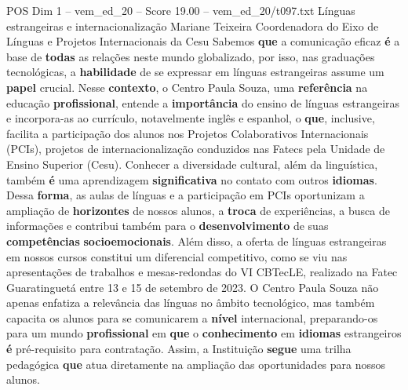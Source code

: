 \begin{textsample}{POS Dim 1 – vem\_ed\_20 – Score 19.00 – vem\_ed\_20/t097.txt}  \label{ex:f1_pos_106}
Línguas estrangeiras e internacionalização Mariane Teixeira Coordenadora do Eixo de Línguas e Projetos Internacionais da Cesu Sabemos \textbf{que} a comunicação eficaz \textbf{é} a base de \textbf{todas} as relações neste mundo globalizado, por isso, nas graduações tecnológicas, a \textbf{habilidade} de se expressar em línguas estrangeiras assume um \textbf{papel} crucial.
Nesse \textbf{contexto}, o Centro Paula Souza, uma \textbf{referência} na educação \textbf{profissional}, entende a \textbf{importância} do ensino de línguas estrangeiras e incorpora-as ao currículo, notavelmente inglês e espanhol, o \textbf{que}, inclusive, facilita a participação dos alunos nos Projetos Colaborativos Internacionais (PCIs), projetos de internacionalização conduzidos nas Fatecs pela Unidade de Ensino Superior (Cesu).
Conhecer a diversidade cultural, além da linguística, também \textbf{é} uma aprendizagem \textbf{significativa} no contato com outros \textbf{idiomas}.
Dessa \textbf{forma}, as aulas de línguas e a participação em PCIs oportunizam a ampliação de \textbf{horizontes} de nossos alunos, a \textbf{troca} de experiências, a busca de informações e contribui também para o \textbf{desenvolvimento} de suas \textbf{competências} \textbf{socioemocionais}.
Além disso, a oferta de línguas estrangeiras em nossos cursos constitui um diferencial competitivo, como se viu nas apresentações de trabalhos e mesas-redondas do VI CBTecLE, realizado na Fatec Guaratinguetá entre 13 e 15 de setembro de 2023.
O Centro Paula Souza não apenas enfatiza a relevância das línguas no âmbito tecnológico, mas também capacita os alunos para se comunicarem a \textbf{nível} internacional, preparando-os para um mundo \textbf{profissional} em \textbf{que} o \textbf{conhecimento} em \textbf{idiomas} estrangeiros \textbf{é} pré-requisito para contratação.
Assim, a Instituição \textbf{segue} uma trilha pedagógica \textbf{que} atua diretamente na ampliação das oportunidades para nossos alunos.

\end{textsample}
